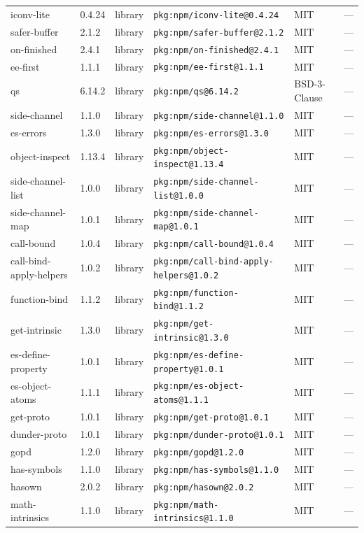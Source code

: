 \documentclass[11pt]{article}
\begin{document}
\begin{longtable}{|l|l|l|p{2.2cm}|l|p{4cm}|}
iconv-lite & 0.4.24 & library & \texttt{pkg:npm/iconv-lite@0.4.24} & MIT & — \\
safer-buffer & 2.1.2 & library & \texttt{pkg:npm/safer-buffer@2.1.2} & MIT & — \\
on-finished & 2.4.1 & library & \texttt{pkg:npm/on-finished@2.4.1} & MIT & — \\
ee-first & 1.1.1 & library & \texttt{pkg:npm/ee-first@1.1.1} & MIT & — \\
qs & 6.14.2 & library & \texttt{pkg:npm/qs@6.14.2} & BSD-3-Clause & — \\
side-channel & 1.1.0 & library & \texttt{pkg:npm/side-channel@1.1.0} & MIT & — \\
es-errors & 1.3.0 & library & \texttt{pkg:npm/es-errors@1.3.0} & MIT & — \\
object-inspect & 1.13.4 & library & \texttt{pkg:npm/object-inspect@1.13.4} & MIT & — \\
side-channel-list & 1.0.0 & library & \texttt{pkg:npm/side-channel-list@1.0.0} & MIT & — \\
side-channel-map & 1.0.1 & library & \texttt{pkg:npm/side-channel-map@1.0.1} & MIT & — \\
call-bound & 1.0.4 & library & \texttt{pkg:npm/call-bound@1.0.4} & MIT & — \\
call-bind-apply-helpers & 1.0.2 & library & \texttt{pkg:npm/call-bind-apply-helpers@1.0.2} & MIT & — \\
function-bind & 1.1.2 & library & \texttt{pkg:npm/function-bind@1.1.2} & MIT & — \\
get-intrinsic & 1.3.0 & library & \texttt{pkg:npm/get-intrinsic@1.3.0} & MIT & — \\
es-define-property & 1.0.1 & library & \texttt{pkg:npm/es-define-property@1.0.1} & MIT & — \\
es-object-atoms & 1.1.1 & library & \texttt{pkg:npm/es-object-atoms@1.1.1} & MIT & — \\
get-proto & 1.0.1 & library & \texttt{pkg:npm/get-proto@1.0.1} & MIT & — \\
dunder-proto & 1.0.1 & library & \texttt{pkg:npm/dunder-proto@1.0.1} & MIT & — \\
gopd & 1.2.0 & library & \texttt{pkg:npm/gopd@1.2.0} & MIT & — \\
has-symbols & 1.1.0 & library & \texttt{pkg:npm/has-symbols@1.1.0} & MIT & — \\
hasown & 2.0.2 & library & \texttt{pkg:npm/hasown@2.0.2} & MIT & — \\
math-intrinsics & 1.1.0 & library & \texttt{pkg:npm/math-intrinsics@1.1.0} & MIT & — \\

\end{longtable}
\end{document}
